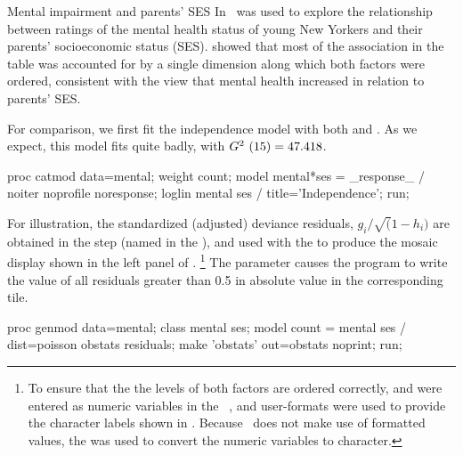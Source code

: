 \begin{Example}[mental2]{Mental impairment and parents' SES}
In  \CA\ was used to explore the relationship between
ratings of the mental health status of young New Yorkers and
their parents' socioeconomic status (SES).
 showed that most of the association in the
table was accounted for by a single dimension along which both factors
were ordered, consistent with the view that mental health increased
in relation to parents' SES.

For comparison, we first fit the independence model with both
 and .
As we expect, this model fits quite badly,
with $G^2\ (15) = 47.418$.
\begin{listing}
proc catmod data=mental;
   weight count;
   model mental*ses = _response_ / noiter noprofile noresponse;
   loglin mental ses / title='Independence';
   run;
\end{listing}
For illustration, the standardized (adjusted) deviance residuals,
$g_i / \sqrt ( 1 - h_i )$
are obtained in the 
step (named  in the  \Dset),
and used with the  to produce the mosaic
display shown in the left panel of .%
\footnote{To ensure that the the levels of both factors are ordered
correctly,  and  were entered as numeric
variables in the \Dset\ , and user-formats were used
to provide the character labels shown in .
Because \IML\ does not make use of formatted values, the 
was used to convert the numeric variables to character.
}
The parameter 
causes the program to write the value of all residuals greater than 0.5
in absolute value in the corresponding tile.
\begin{listing}
proc genmod data=mental;
   class mental ses;
   model count = mental ses / dist=poisson obstats residuals;
   make 'obstats' out=obstats noprint;
run;


\end{listing}
\end{Example}
